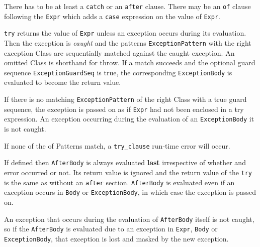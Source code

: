 There has to be at least a \texttt{catch} or an \texttt{after}
clause. There may be an \texttt{of} clause following the \texttt{Expr}
which adds a \texttt{case} expression on the value of \texttt{Expr}.

\texttt{try} returns the value of \texttt{Expr} unless an exception
occurs during its evaluation. Then the exception is \textit{caught}
and the patterns \texttt{ExceptionPattern} with the right exception
Class are sequentially matched against the caught exception. An
omitted Class is shorthand for throw. If a match succeeds and the
optional guard sequence \texttt{ExceptionGuardSeq} is true, the
corresponding \texttt{ExceptionBody} is evaluated to become the return
value.

If there is no matching \texttt{ExceptionPattern} of the right Class
with a true guard sequence, the exception is passed on as if
\texttt{Expr} had not been enclosed in a try expression. An exception
occurring during the evaluation of an \texttt{ExceptionBody} it is not
caught.

If none of the of Patterns match, a \texttt{try\_clause} run-time
error will occur.

If defined then \texttt{AfterBody} is always evaluated \textbf{last}
irrespective of whether and error occurred or not. Its return value is
ignored and the return value of the \texttt{try} is the same as
without an \texttt{after} section. \texttt{AfterBody} is evaluated
even if an exception occurs in \texttt{Body} or
\texttt{ExceptionBody}, in which case the exception is passed on.


An exception that occurs during the evaluation of \texttt{AfterBody}
itself is not caught, so if the \texttt{AfterBody} is evaluated due to
an exception in \texttt{Expr}, \texttt{Body} or
\texttt{ExceptionBody}, that exception is lost and masked by the new
exception.

